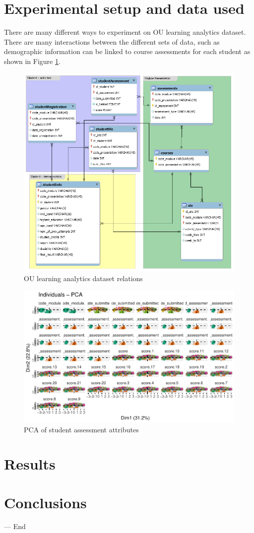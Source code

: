 \documentclass[12pt]{article}
\begin{document}
\section{Experimental setup and data used}

There are many different ways to experiment on OU learning analytics dataset. There are many interactions between the different sets of data, such as demographic
information can be linked to course assessments for each student as shown in Figure \ref{fig:db_model}.

 \begin{figure}[h]
 \centering
 \includegraphics[scale=0.5]{db_model.png}
 \caption{OU learning analytics dataset relations}
 \label{fig:db_model}
 \end{figure}
 
\begin{figure}[h]
 \centering
 \includegraphics[scale=0.8]{PCA_Assessments_first50.pdf}
 \caption{PCA of student assessment attributes}
 \label{fig:pca}
 \end{figure}

\section{Results}

\section{Conclusions}


\hspace{1 cm}--- End

\newpage


\end{document}
